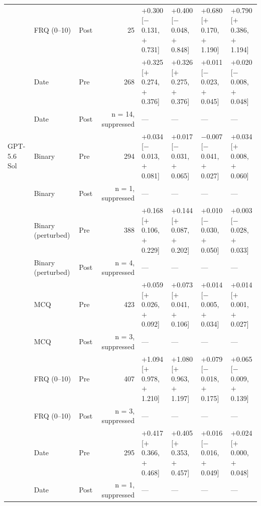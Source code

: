 \begin{table}[p]
\begin{tabular}{l l l r l l l l}
 & FRQ (0--10) & Post & 25 & $+$0.300 {\scriptsize[$-$0.131, $+$0.731]} & $+$0.400 {\scriptsize[$-$0.048, $+$0.848]} & $+$0.680 {\scriptsize[$+$0.170, $+$1.190]} & $+$0.790 {\scriptsize[$+$0.386, $+$1.194]} \\
 & Date & Pre & 268 & $+$0.325 {\scriptsize[$+$0.274, $+$0.376]} & $+$0.326 {\scriptsize[$+$0.275, $+$0.376]} & $+$0.011 {\scriptsize[$-$0.023, $+$0.045]} & $+$0.020 {\scriptsize[$-$0.008, $+$0.048]} \\
 & Date & Post & n = 14, suppressed & --- & --- & --- & --- \\
\addlinespace
GPT-5.6 Sol & Binary & Pre & 294 & $+$0.034 {\scriptsize[$-$0.013, $+$0.081]} & $+$0.017 {\scriptsize[$-$0.031, $+$0.065]} & $-$0.007 {\scriptsize[$-$0.041, $+$0.027]} & $+$0.034 {\scriptsize[$+$0.008, $+$0.060]} \\
 & Binary & Post & n = 1, suppressed & --- & --- & --- & --- \\
 & Binary (perturbed) & Pre & 388 & $+$0.168 {\scriptsize[$+$0.106, $+$0.229]} & $+$0.144 {\scriptsize[$+$0.087, $+$0.202]} & $+$0.010 {\scriptsize[$-$0.030, $+$0.050]} & $+$0.003 {\scriptsize[$-$0.028, $+$0.033]} \\
 & Binary (perturbed) & Post & n = 4, suppressed & --- & --- & --- & --- \\
 & MCQ & Pre & 423 & $+$0.059 {\scriptsize[$+$0.026, $+$0.092]} & $+$0.073 {\scriptsize[$+$0.041, $+$0.106]} & $+$0.014 {\scriptsize[$-$0.005, $+$0.034]} & $+$0.014 {\scriptsize[$+$0.001, $+$0.027]} \\
 & MCQ & Post & n = 3, suppressed & --- & --- & --- & --- \\
 & FRQ (0--10) & Pre & 407 & $+$1.094 {\scriptsize[$+$0.978, $+$1.210]} & $+$1.080 {\scriptsize[$+$0.963, $+$1.197]} & $+$0.079 {\scriptsize[$-$0.018, $+$0.175]} & $+$0.065 {\scriptsize[$-$0.009, $+$0.139]} \\
 & FRQ (0--10) & Post & n = 3, suppressed & --- & --- & --- & --- \\
 & Date & Pre & 295 & $+$0.417 {\scriptsize[$+$0.366, $+$0.468]} & $+$0.405 {\scriptsize[$+$0.353, $+$0.457]} & $+$0.016 {\scriptsize[$-$0.016, $+$0.049]} & $+$0.024 {\scriptsize[$+$0.000, $+$0.048]} \\
 & Date & Post & n = 1, suppressed & --- & --- & --- & --- \\
\bottomrule
\end{tabular}
\end{table}
